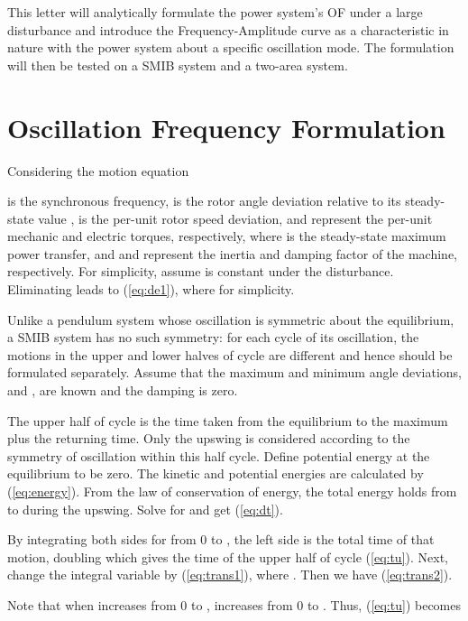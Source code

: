\documentclass[journal]{IEEEtran}
\begin{document}
This letter will analytically formulate the power system's OF under a large disturbance and introduce the Frequency-Amplitude curve as a characteristic in nature with the power system about a specific oscillation mode. The formulation will then be tested on a SMIB system and a two-area system.





\section{Oscillation Frequency Formulation}
Considering the motion equation

 is the synchronous frequency,  is the rotor angle deviation relative to its steady-state value ,  is the per-unit rotor speed deviation,  and  represent the per-unit mechanic and electric torques, respectively, where  is the steady-state maximum power transfer, and  and  represent the inertia and damping factor of the machine, respectively. For simplicity, assume  is constant under the disturbance. Eliminating  leads to (\ref{eq:de1}), where  for simplicity.



Unlike a pendulum system whose oscillation is symmetric about the equilibrium, a SMIB system has no such symmetry\cite{pendulum}: for each cycle of its oscillation, the motions in the upper and lower halves of cycle are different and hence should be formulated separately. Assume that the maximum and minimum angle deviations,  and , are known and the damping is zero.


The upper half of cycle is the time taken from the equilibrium to the maximum plus the returning time. Only the upswing is considered according to the symmetry of oscillation within this half cycle. Define potential energy at the equilibrium to be zero. The kinetic and potential energies are calculated by (\ref{eq:energy}). From the law of conservation of energy, the total energy holds from  to  during the upswing. Solve for  and get (\ref{eq:dt}).



By integrating both sides for  from 0 to , the left side is the total time of that motion, doubling which gives the time of the upper half of cycle (\ref{eq:tu}). Next, change the integral variable by (\ref{eq:trans1}), where . Then we have (\ref{eq:trans2}).




Note that when  increases from 0 to ,  increases from 0 to . Thus, (\ref{eq:tu}) becomes
\end{document}

